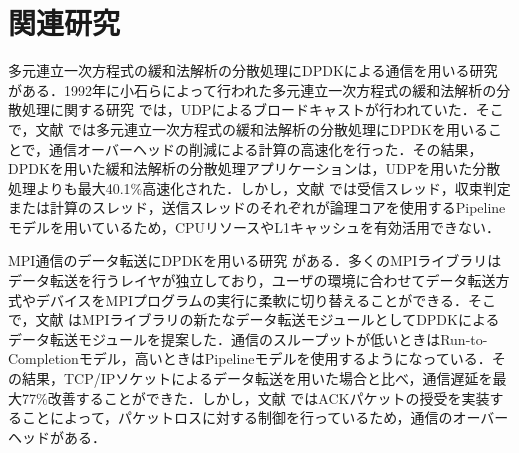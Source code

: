 \section{関連研究}
\label{sec:RelatedWorks}
多元連立一次方程式の緩和法解析の分散処理にDPDKによる通信を用いる研究 \cite{RelaxationMethodDPDK} がある．1992年に小石らによって行われた多元連立一次方程式の緩和法解析の分散処理に関する研究 \cite{RelaxationMethodUDP} では，UDPによるブロードキャストが行われていた．そこで，文献 \cite{RelaxationMethodDPDK} では多元連立一次方程式の緩和法解析の分散処理にDPDKを用いることで，通信オーバーヘッドの削減による計算の高速化を行った．その結果，DPDKを用いた緩和法解析の分散処理アプリケーションは，UDPを用いた分散処理よりも最大40.1\%高速化された．しかし，文献 \cite{RelaxationMethodDPDK} では受信スレッド，収束判定または計算のスレッド，送信スレッドのそれぞれが論理コアを使用するPipelineモデルを用いているため，CPUリソースやL1キャッシュを有効活用できない．

MPI通信のデータ転送にDPDKを用いる研究 \cite{MPIDPDK} がある．多くのMPIライブラリはデータ転送を行うレイヤが独立しており，ユーザの環境に合わせてデータ転送方式やデバイスをMPIプログラムの実行に柔軟に切り替えることができる．そこで，文献 \cite{MPIDPDK} はMPIライブラリの新たなデータ転送モジュールとしてDPDKによるデータ転送モジュールを提案した．通信のスループットが低いときはRun-to-Completionモデル，高いときはPipelineモデルを使用するようになっている．その結果，TCP/IPソケットによるデータ転送を用いた場合と比べ，通信遅延を最大77\%改善することができた．しかし，文献 \cite{MPIDPDK} ではACKパケットの授受を実装することによって，パケットロスに対する制御を行っているため，通信のオーバーヘッドがある．
